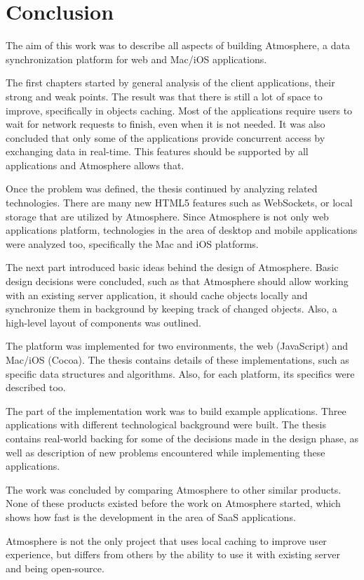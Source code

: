 \section{Conclusion}

The aim of this work was to describe all aspects of building Atmosphere, a data synchronization platform for web and Mac/iOS applications.

The first chapters started by general analysis of the client applications, their strong and weak points. The result was that there is still a lot of space to improve, specifically in objects caching. Most of the applications require users to wait for network requests to finish, even when it is not needed. It was also concluded that only some of the applications provide concurrent access by exchanging data in real-time. This features should be supported by all applications and Atmosphere allows that.

Once the problem was defined, the thesis continued by analyzing related technologies. There are many new HTML5 features such as WebSockets, or local storage that are utilized by Atmosphere. Since Atmosphere is not only web applications platform, technologies in the area of desktop and mobile applications were analyzed too, specifically the Mac and iOS platforms.

The next part introduced basic ideas behind the design of Atmosphere. Basic design decisions were concluded, such as that Atmosphere should allow working with an existing server application, it should cache objects locally and synchronize them in background by keeping track of changed objects. Also, a high-level layout of components was outlined.

The platform was implemented for two environments, the web (JavaScript) and Mac/iOS (Cocoa). The thesis contains details of these implementations, such as specific data structures and algorithms. Also, for each platform, its specifics were described too.

The part of the implementation work was to build example applications. Three applications with different technological background were built. The thesis contains real-world backing for some of the decisions made in the design phase, as well as description of new problems encountered while implementing these applications.

The work was concluded by comparing Atmosphere to other similar products. None of these products existed before the work on Atmosphere started, which shows how fast is the development in the area of SaaS applications.

Atmosphere is not the only project that uses local caching to improve user experience, but differs from others by the ability to use it with existing server and being open-source.